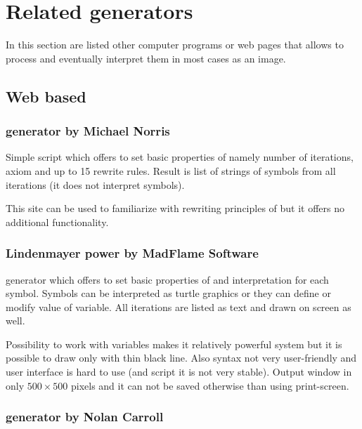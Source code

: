
\section{Related \lsystem generators}

In this section are listed other computer programs or web pages that allows to process \lsystems and eventually interpret them in most cases as an image.

\subsection{Web based}
\label{sec:WebBasedGenerators}

\subsubsection{\lsystem generator by Michael Norris}

\noindent
Simple script which offers to set basic properties of \lsystem namely number of iterations, axiom and up to 15 rewrite rules.
Result is list of strings of symbols from all iterations (it does not interpret symbols).

This site can be used to familiarize with rewriting principles of \lsystems but it offers no additional functionality.


\subsubsection{Lindenmayer power by MadFlame Software}

\noindent
\lsystem generator which offers to set basic properties of \lsystem and interpretation for each symbol.
Symbols can be interpreted as turtle graphics or they can define or modify value of variable.
All iterations are listed as text and drawn on screen as well.

Possibility to work with variables makes it relatively powerful system but it is possible to draw only with thin black line.
Also syntax not very user-friendly and user interface is hard to use (and script it is not very stable).
Output window in only $500 \times 500$ pixels and it can not be saved otherwise than using print-screen.


\subsubsection{\lsystem generator by Nolan Carroll}	

